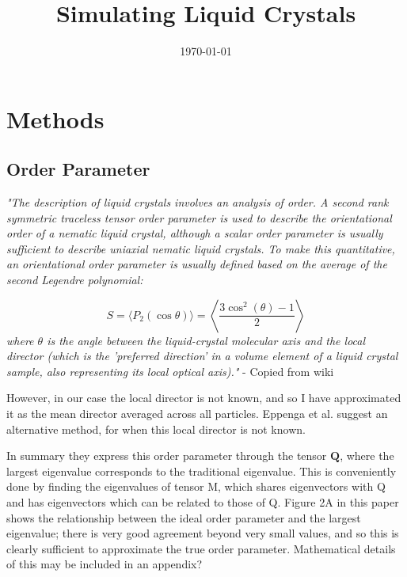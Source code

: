 \documentclass[11pt, a4paper]{article} %
\title{Simulating Liquid Crystals}
\author{\authorstyle{Kit Gallagher} 
	\institution{Supervisors: Prof Erika Eiser, Mr Jiaming Yu}}
\date{\today} %
\begin{document}
\maketitle %

\thispagestyle{firstpage} %






\section{Methods}
\subsection{Order Parameter} \label{Order_param_theory}
\textit{"The description of liquid crystals involves an analysis of order. A second rank symmetric traceless tensor order parameter is used to describe the orientational order of a nematic liquid crystal, although a scalar order parameter is usually sufficient to describe uniaxial nematic liquid crystals. To make this quantitative, an orientational order parameter is usually defined based on the average of the second Legendre polynomial:}

\begin{equation}
 S=\langle P_{2}(\cos \theta )\rangle =\left\langle {\frac {3\cos ^{2}(\theta )-1}{2}}\right\rangle
\end{equation}
\textit{where $\theta$ is the angle between the liquid-crystal molecular axis and the local director (which is the 'preferred direction' in a volume element of a liquid crystal sample, also representing its local optical axis)."} - Copied from wiki

However, in our case the local director is not known, and so I have approximated it as the mean director averaged across all particles. Eppenga et al. \cite{Eppenga1984} suggest an alternative method, for when this local director is not known.

In summary they express this order parameter through the tensor $\textbf{Q}$, where the largest eigenvalue corresponds to the traditional eigenvalue.
This is conveniently done by finding the eigenvalues of tensor M, which shares eigenvectors with Q and has eigenvectors which can be related to those of Q.
Figure 2A in this paper shows the relationship between the ideal order parameter and the largest eigenvalue; there is very good agreement beyond very small values, and so this is clearly sufficient to approximate the true order parameter. Mathematical details of this may be included in an appendix?
\end{document}
